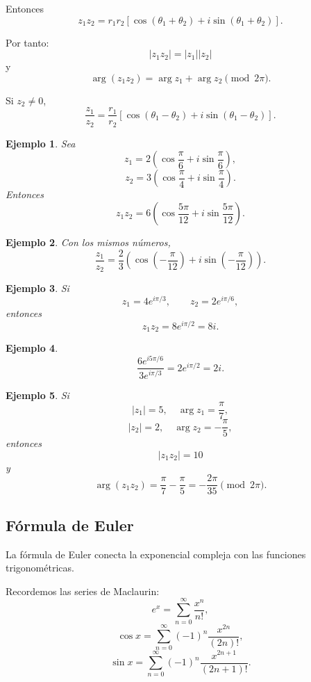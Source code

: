 \documentclass[12pt]{article}
\newtheorem{Ejem}{Ejemplo}
\begin{document}
Entonces
\[
\boxed{
z_1z_2
=
r_1r_2
\left[
\cos(\theta_1+\theta_2)
+i\sin(\theta_1+\theta_2)
\right].
}
\]

Por tanto:
\[
\boxed{
|z_1z_2|=|z_1||z_2|
}
\]
y
\[
\arg(z_1z_2)
=
\arg z_1+\arg z_2
\pmod{2\pi}.
\]

Si $z_2\neq0$,
\[
\boxed{
\frac{z_1}{z_2}
=
\frac{r_1}{r_2}
\left[
\cos(\theta_1-\theta_2)
+i\sin(\theta_1-\theta_2)
\right].
}
\]

\begin{Ejem} Sea
\[
z_1=2\left(\cos\frac{\pi}{6}+i\sin\frac{\pi}{6}\right),
\]
\[
z_2=3\left(\cos\frac{\pi}{4}+i\sin\frac{\pi}{4}\right).
\]
Entonces
\[
z_1z_2
=
6
\left(
\cos\frac{5\pi}{12}
+i\sin\frac{5\pi}{12}
\right).
\]
\end{Ejem}

\begin{Ejem} Con los mismos números,
\[
\frac{z_1}{z_2}
=
\frac23
\left(
\cos\left(-\frac{\pi}{12}\right)
+i\sin\left(-\frac{\pi}{12}\right)
\right).
\]

\end{Ejem}

\begin{Ejem} Si
\[
z_1=4e^{i\pi/3},
\qquad
z_2=2e^{i\pi/6},
\]
entonces
\[
z_1z_2
=
8e^{i\pi/2}
=
8i.
\]

\end{Ejem}

\begin{Ejem} \[
\frac{6e^{i5\pi/6}}{3e^{i\pi/3}}
=
2e^{i\pi/2}
=
2i.
\]

\end{Ejem}

\begin{Ejem} Si
\[
|z_1|=5,\quad \arg z_1=\frac{\pi}{7},
\]
\[
|z_2|=2,\quad \arg z_2=-\frac{\pi}{5},
\]
entonces
\[
|z_1z_2|=10
\]
y
\[
\arg(z_1z_2)
=
\frac{\pi}{7}-\frac{\pi}{5}
=
-\frac{2\pi}{35}
\pmod{2\pi}.
\]
\end{Ejem}


\subsection*{Fórmula de Euler}

La fórmula de Euler conecta la exponencial compleja con las funciones
trigonométricas.

Recordemos las series de Maclaurin:
\[
e^x
=
\sum_{n=0}^{\infty}\frac{x^n}{n!},
\]
\[
\cos x
=
\sum_{n=0}^{\infty}
(-1)^n\frac{x^{2n}}{(2n)!},
\]
\[
\sin x
=
\sum_{n=0}^{\infty}
(-1)^n\frac{x^{2n+1}}{(2n+1)!}.
\]
\end{document}
